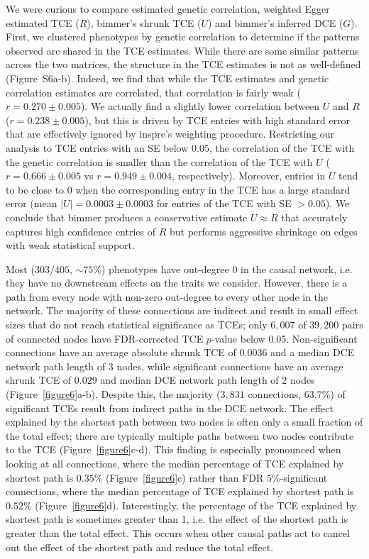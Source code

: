 \documentclass{article}
\begin{document}
We were curious to compare estimated
genetic correlation, weighted Egger estimated TCE ($R$), bimmer's
shrunk TCE ($U$) and bimmer's inferred DCE ($G$). First, we clustered phenotypes by genetic correlation
to determine if the patterns observed are shared in the TCE estimates.
While there are some similar patterns across the two matrices, the structure in the TCE estimates
is not as well-defined (Figure~S6a-b).
Indeed, we find that while the TCE estimates
and genetic correlation estimates are correlated, that correlation is fairly
weak ($r = 0.270\pm 0.005$). We actually find a slightly lower correlation between
 $U$ and $R$ ($r = 0.238 \pm 0.005$), but this is driven by TCE entries with high 
standard error that are effectively ignored by inspre's weighting procedure.
Restricting our analysis to TCE entries with an
SE below $0.05$, the correlation of the TCE with the genetic correlation is smaller
than the correlation of the TCE with $U$ ($r = 0.666 \pm 0.005$ vs $r = 0.949 \pm 0.004$, respectively).
Moreover, entries in $U$ tend to be close to $0$ when the corresponding
entry in the TCE has a large standard error (mean ${|U|} = 0.0003 \pm 0.0003$ for entries of
the TCE with SE $> 0.05$). We conclude that bimmer produces a conservative
estimate $U \approx R$ that accurately captures high confidence
entries of $R$ but performs aggressive shrinkage on edges with weak statistical support. 

Most ($303/405$, $\sim 75\%$) phenotypes have out-degree $0$ in the causal network, i.e. they have no
downstream effects on the traits we consider. However, there is a path from every node with non-zero
out-degree to every other node in the network. The majority of these connections
are indirect and result in small effect sizes that do not reach
statistical significance as TCEs; only
$6,007$ of $39,200$ pairs of connected nodes have FDR-corrected TCE $p$-value below 0.05.
Non-significant connections have an average absolute shrunk TCE of $0.0036$
and a median DCE network path length of $3$ nodes, while
significant connections have an average shrunk TCE of $0.029$ and median DCE network path length of $2$ nodes
(Figure~\ref{figure6}a-b). Despite this, the majority
 ($3,831$ connections, $63.7\%$) of significant TCEs result from indirect paths in the DCE network.
The effect explained by the shortest path between two nodes is often only a small
fraction of the total effect; there are typically multiple paths
between two nodes contribute to the TCE (Figure~\ref{figure6}c-d). This finding is especially pronounced 
when looking at all connections, where  the median percentage of TCE explained
by shortest path is $0.35\%$ (Figure~\ref{figure6}c) rather than FDR $5\%$-significant connections,
where the  median percentage of TCE explained
by shortest path is $0.52\%$ (Figure~\ref{figure6}d).
Interestingly, the percentage of the TCE explained
by shortest path is sometimes greater than 1, i.e. the
effect of the shortest path is greater than the total effect. This occurs
when other causal paths act to cancel out the effect of the shortest path and reduce the total effect.
\end{document}
